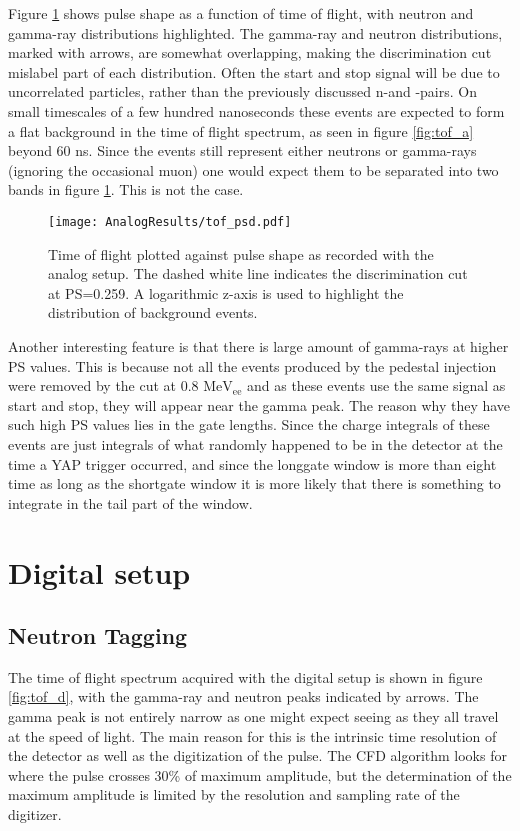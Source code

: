 \documentclass[main.tex]{subfiles}
\begin{document}
Figure \ref{fig:tof_ps_a} shows pulse shape as a function of time of flight, with neutron and gamma-ray distributions highlighted. The gamma-ray and neutron distributions, marked with arrows, are somewhat overlapping, making the discrimination cut mislabel part of each distribution. Often the start and stop signal will be due to uncorrelated particles, rather than the previously discussed n-\textgamma and \textgamma-\textgamma pairs. On small timescales of a few hundred nanoseconds these events are expected to form a flat background in the time of flight spectrum, as seen in figure \ref{fig:tof_a} beyond 60 ns. Since the events still represent either neutrons or gamma-rays (ignoring the occasional muon) one would expect them to be separated into two bands in figure \ref{fig:tof_ps_a}. This is not the case.

\begin{figure}[ht]
    \centering
        \texttt{[image: AnalogResults/tof\_psd.pdf]}
        \caption[Heat map of pulse shape as a function of time of flight.]{Time of flight plotted against pulse shape as recorded with the analog setup. The dashed white line indicates the discrimination cut at PS=0.259. A logarithmic z-axis is used to highlight the distribution of background events.}
    \label{fig:tof_ps_a} 
\end{figure}




Another interesting feature is that there is large amount of gamma-rays at higher PS values. This is because not all the events produced by the pedestal injection were removed by the cut at 0.8 $\text{MeV}_\text{ee}$ and as these events use the same signal as start and stop, they will appear near the gamma peak. The reason why they have such high PS values lies in the gate lengths. Since the charge integrals of these events are just integrals of what randomly happened to be in the detector at the time a YAP trigger occurred, and since the longgate window is more than eight time as long as the shortgate window it is more likely that there is something to integrate in the tail part of the window.



\section{Digital setup}

\subsection{Neutron Tagging}
The time of flight spectrum acquired with the digital setup is shown in figure \ref{fig:tof_d}, with the gamma-ray and neutron peaks indicated by arrows. The gamma peak is not entirely narrow as one might expect seeing as they all travel at the speed of light. The main reason for this is the intrinsic time resolution of the detector as well as the digitization of the pulse. The CFD algorithm looks for where the pulse crosses 30\% of maximum amplitude, but the determination of the maximum amplitude is limited by the resolution and sampling rate of the digitizer.
\end{document}
